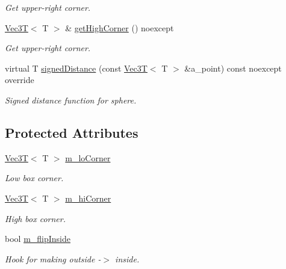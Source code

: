 \begin{DoxyCompactItemize}
\begin{DoxyCompactList}\small\item\em Get upper-\/right corner. \end{DoxyCompactList}\item 
\hyperlink{classVec3T}{Vec3T}$<$ T $>$ \& \hyperlink{classBoxSDF_a624cf8fea66776ecce602039beb1059c}{get\+High\+Corner} () noexcept
\begin{DoxyCompactList}\small\item\em Get upper-\/right corner. \end{DoxyCompactList}\item 
virtual T \hyperlink{classBoxSDF_a6e7a72790061423e5c9ea47d9e26736f}{signed\+Distance} (const \hyperlink{classVec3T}{Vec3T}$<$ T $>$ \&a\+\_\+point) const noexcept override
\begin{DoxyCompactList}\small\item\em Signed distance function for sphere. \end{DoxyCompactList}\end{DoxyCompactItemize}
\subsection*{Protected Attributes}
\begin{DoxyCompactItemize}
\item 
\mbox{\label{classBoxSDF_a7286bfb7a6669127b4902b1b2e9a2c80}} 
\hyperlink{classVec3T}{Vec3T}$<$ T $>$ \hyperlink{classBoxSDF_a7286bfb7a6669127b4902b1b2e9a2c80}{m\+\_\+lo\+Corner}
\begin{DoxyCompactList}\small\item\em Low box corner. \end{DoxyCompactList}\item 
\mbox{\label{classBoxSDF_a96181447700a9106e937fa2ff73499b1}} 
\hyperlink{classVec3T}{Vec3T}$<$ T $>$ \hyperlink{classBoxSDF_a96181447700a9106e937fa2ff73499b1}{m\+\_\+hi\+Corner}
\begin{DoxyCompactList}\small\item\em High box corner. \end{DoxyCompactList}\item 
\mbox{\label{classBoxSDF_aac14b4352ba92c067f70884a99c934bf}} 
bool \hyperlink{classBoxSDF_aac14b4352ba92c067f70884a99c934bf}{m\+\_\+flip\+Inside}
\begin{DoxyCompactList}\small\item\em Hook for making outside -\/$>$ inside. \end{DoxyCompactList}\end{DoxyCompactItemize}
